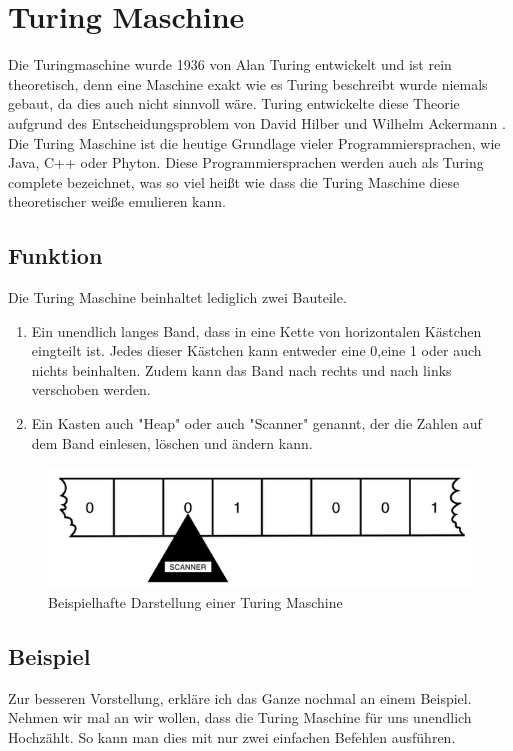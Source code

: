 \section{Turing Maschine}
\label{turingmaschine}
Die Turingmaschine wurde 1936 von Alan Turing entwickelt und ist rein theoretisch, denn eine Maschine exakt wie es Turing beschreibt wurde niemals gebaut, da dies auch nicht sinnvoll wäre. Turing entwickelte diese Theorie aufgrund des Entscheidungsproblem von David Hilber und Wilhelm Ackermann \cite{theessentialturing}. Die Turing Maschine ist die heutige Grundlage vieler Programmiersprachen, wie Java, C++ oder Phyton. Diese Programmiersprachen werden auch als Turing complete bezeichnet, was so viel heißt wie dass die Turing Maschine diese theoretischer weiße emulieren kann.

\subsection{Funktion} 
Die Turing Maschine beinhaltet lediglich zwei Bauteile.
\begin{enumerate}
\item  Ein unendlich langes Band, dass in eine Kette von horizontalen Kästchen eingteilt ist. Jedes dieser Kästchen kann entweder eine 0,eine 1 oder auch nichts beinhalten. Zudem kann das Band nach rechts und nach links verschoben werden.
\item Ein Kasten auch "Heap" oder auch "Scanner" genannt, der die Zahlen auf dem Band einlesen, löschen und ändern kann.
\end{enumerate}
 
\begin{figure}[hbtp]
\centering
\includegraphics[scale=1]{TuringmashinePicture.png}
\caption{Beispielhafte Darstellung einer Turing Maschine\cite{theessentialturing}}
\end{figure}

\subsection{Beispiel} Zur besseren Vorstellung, erkläre ich das Ganze nochmal an einem Beispiel. Nehmen wir mal an wir wollen, dass die Turing Maschine für uns unendlich Hochzählt. So kann man dies mit nur zwei einfachen Befehlen ausführen. 

